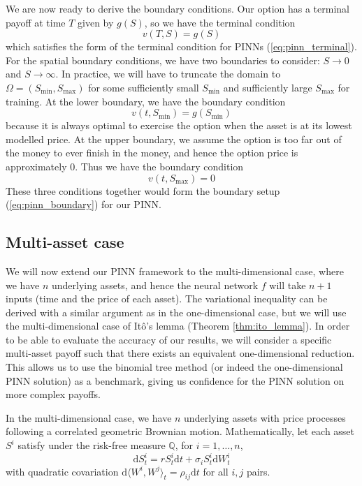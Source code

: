 We are now ready to derive the boundary conditions. Our option has a terminal payoff at time $T$ given by $g(S)$, so we have the terminal condition
\begin{equation}
    v(T, S) = g(S)
\end{equation}
which satisfies the form of the terminal condition for PINNs (\ref{eq:pinn_terminal}). For the spatial boundary conditions, we have two boundaries to consider: $S \to 0$ and $S \to \infty$. In practice, we will have to truncate the domain to $\Omega = (S_\text{min}, S_\text{max})$ for some sufficiently small $S_\text{min}$ and sufficiently large $S_\text{max}$ for training. At the lower boundary, we have the boundary condition
\begin{equation}
    v(t, S_\text{min}) = g(S_\text{min})
\end{equation}
because it is always optimal to exercise the option when the asset is at its lowest modelled price. At the upper boundary, we assume the option is too far out of the money to ever finish in the money, and hence the option price is approximately $0$. Thus we have the boundary condition
\begin{equation}
    v(t, S_\text{max}) = 0
\end{equation}
These three conditions together would form the boundary setup (\ref{eq:pinn_boundary}) for our PINN.

\subsection{Multi-asset case}

We will now extend our PINN framework to the multi-dimensional case, where we have $n$ underlying assets, and hence the neural network $f$ will take $n+1$ inputs (time and the price of each asset). The variational inequality can be derived with a similar argument as in the one-dimensional case, but we will use the multi-dimensional case of Itô's lemma (Theorem \ref{thm:ito_lemma}). In order to be able to evaluate the accuracy of our results, we will consider a specific multi-asset payoff such that there exists an equivalent one-dimensional reduction. This allows us to use the binomial tree method (or indeed the one-dimensional PINN solution) as a benchmark, giving us confidence for the PINN solution on more complex payoffs.

In the multi-dimensional case, we have $n$ underlying assets with price processes following a correlated geometric Brownian motion. Mathematically, let each asset $S^i$ satisfy under the risk-free measure $\mathbb Q$, for $i = 1, \dots, n$,
\begin{equation}
\mathrm dS_t^i = rS_t^i\mathrm dt + \sigma_i S^i_t \mathrm dW_t^i
\end{equation}
with quadratic covariation $\mathrm d \langle W^i, W^j\rangle_t = \rho_{ij}\mathrm dt$ for all $i, j$ pairs.


